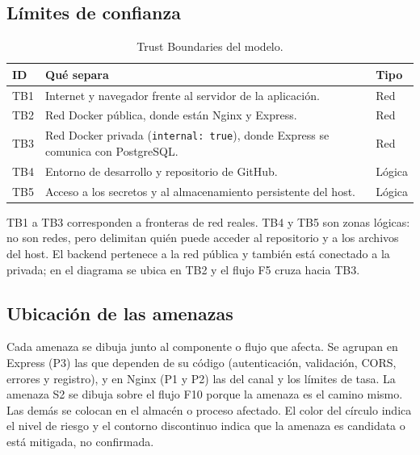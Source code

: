 \subsection{Límites de confianza}

\begin{table}[H]
\centering
\caption{Trust Boundaries del modelo.}
\label{tab:tb}

\begin{tabularx}{\textwidth}{l X l}
\toprule
\textbf{ID} &
\textbf{Qué separa} &
\textbf{Tipo} \\
\midrule
TB1 & Internet y navegador frente al servidor de la aplicación. &
Red \\

TB2 & Red Docker pública, donde están Nginx y Express. &
Red \\

TB3 & Red Docker privada (\texttt{internal: true}), donde Express se
comunica con PostgreSQL. &
Red \\

TB4 & Entorno de desarrollo y repositorio de GitHub. &
Lógica \\

TB5 & Acceso a los secretos y al almacenamiento persistente del host. &
Lógica \\
\bottomrule
\end{tabularx}
\end{table}

TB1 a TB3 corresponden a fronteras de red reales. TB4 y TB5 son zonas
lógicas: no son redes, pero delimitan quién puede acceder al repositorio y a
los archivos del host. El backend pertenece a la red pública y también está
conectado a la privada; en el diagrama se ubica en TB2 y el flujo F5 cruza
hacia TB3.

\subsection{Ubicación de las amenazas}

Cada amenaza se dibuja junto al componente o flujo que afecta. Se agrupan en
Express (P3) las que dependen de su código (autenticación, validación, CORS,
errores y registro), y en Nginx (P1 y P2) las del canal y los límites de
tasa. La amenaza S2 se dibuja sobre el flujo F10 porque la amenaza es el
camino mismo. Las demás se colocan en el almacén o proceso afectado. El color
del círculo indica el nivel de riesgo y el contorno discontinuo indica que la
amenaza es candidata o está mitigada, no confirmada.

